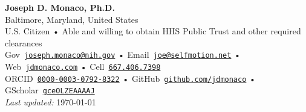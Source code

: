



\begin{center}
  \textbf{\LARGE\color{hopkinsblue} Joseph D. Monaco, Ph.D.} \\[0.1in]
  Baltimore, Maryland, United States \\
  \small
  U.S. Citizen • Able and willing to obtain HHS Public Trust and other required clearances \\[2mm]
  Gov~\href{mailto:joseph.monaco@nih.gov}{\color{hopkinsblue}\texttt{joseph.monaco@nih.gov}} • 
  Email~\href{mailto:joe@selfmotion.net}{\color{hopkinsblue}\texttt{joe@selfmotion.net}} • 
  Web~\href{https://jdmonaco.com/}{\color{hopkinsblue}\texttt{jdmonaco.com}} •   
  Cell~\href{tel:16674067398}{\color{hopkinsblue}\texttt{667.406.7398}} \\  
  ORCID~\href{https://jdmonaco.com/orcid}{\color{hopkinsblue}\texttt{0000-0003-0792-8322}} • 
  GitHub~\href{https://jdmonaco.com/github}{\color{hopkinsblue}\texttt{github.com/jdmonaco}} • 
  GScholar~\href{https://jdmonaco.com/google-scholar}{\color{hopkinsblue}\texttt{gceOLZEAAAAJ}} \\
  {\tiny \emph{Last updated:} \today}
\end{center}

